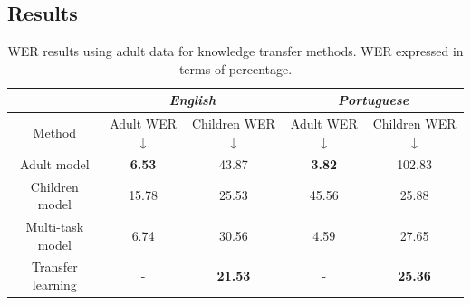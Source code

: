 \subsection{Results}

\begin{table}[h]
    \centering
    \begin{tabular}{c|cc|cc}
    \hline
                      & \multicolumn{2}{c}{\textit{English}} & \multicolumn{2}{|c}{\textit{Portuguese}} \\ \hline
    Method            & Adult WER  $\downarrow$  & Children WER $\downarrow$  & Adult WER  $\downarrow$   & Children WER  $\downarrow$   \\ \hline
    Adult model       & \textbf{6.53}      & 43.87       & \textbf{3.82}       & 102.83        \\
    Children model    & 15.78     & 25.53       & 45.56      & 25.88         \\
    Multi-task model  & 6.74      & 30.56       & 4.59       & 27.65         \\
    Transfer learning & -           & \textbf{21.53}       & -            & \textbf{25.36}         \\ \hline
    \end{tabular}
    \caption{WER results using adult data for knowledge transfer methods. WER expressed in terms of percentage.}
\label{tab:res_exp1}

    \end{table}





